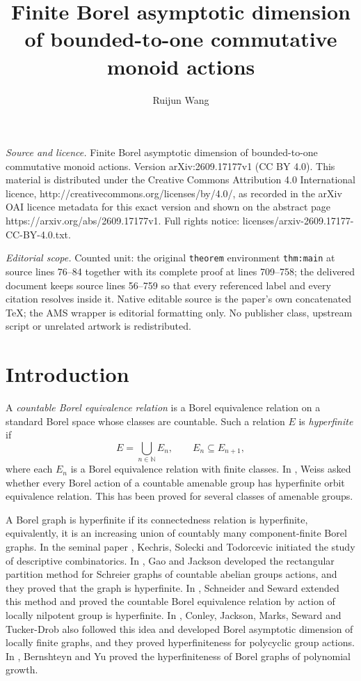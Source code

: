 \documentclass[10pt,a4paper]{amsart}
\newcommand{\NN}{\mathbb N}
\begin{document}
\title[Finite Borel asymptotic dimension of bounded-to-one commutat]{Finite Borel asymptotic dimension of bounded-to-one commutative monoid actions}
\author{Ruijun Wang}
\date{}
\maketitle
\noindent\emph{Source and licence.} Finite Borel asymptotic dimension of bounded-to-one commutative monoid actions. Version arXiv:2609.17177v1 (CC BY 4.0). This material is distributed under the Creative Commons Attribution 4.0 International licence, http://creativecommons.org/licenses/by/4.0/, as recorded in the arXiv OAI licence metadata for this exact version and shown on the abstract page https://arxiv.org/abs/2609.17177v1. Full rights notice: licenses/arxiv-2609.17177-CC-BY-4.0.txt.\par\smallskip
\noindent\textit{Editorial scope.} Counted unit: the original \texttt{theorem} environment \texttt{thm:main} at source lines 76--84 together with its complete proof at lines 709--758; the delivered document keeps source lines 56--759 so that every referenced label and every citation resolves inside it. Native editable source is the paper's own concatenated TeX; the AMS wrapper is editorial formatting only. No publisher class, upstream script or unrelated artwork is redistributed.
\section{Introduction}

A \emph{countable Borel equivalence relation} is a Borel equivalence
relation on a standard Borel space whose classes are countable. Such a
relation $E$ is \emph{hyperfinite} if
\[
 E=\bigcup_{n\in\NN}E_n,
 \qquad E_n\subseteq E_{n+1},
\]
where each $E_n$ is a Borel equivalence relation with finite classes.
In \cite{weiss1984}, Weiss asked whether every Borel action of a countable
amenable group has hyperfinite orbit equivalence relation. This has been
proved for several classes of amenable groups.

A Borel graph is hyperfinite if its connectedness relation is hyperfinite, equivalently, it is an increasing union of countably many component-finite Borel graphs. In the seminal paper \cite{KST1999}, Kechris, Solecki and Todorcevic initiated the study of descriptive combinatorics. In \cite{GJ2015}, Gao and Jackson developed the rectangular partition method for Schreier graphs of countable abelian groups actions, and they proved that the graph is hyperfinite. In \cite{SchneiderSeward2024}, Schneider and Seward extended this method and proved the countable Borel equivalence relation by action of locally nilpotent group is hyperfinite. In \cite{CJMST}, Conley, Jackson, Marks, Seward and Tucker-Drob also followed this idea and developed Borel asymptotic dimension of locally finite graphs, and they proved hyperfiniteness for polycyclic group actions. In \cite{BY}, Bernshteyn and Yu proved the hyperfiniteness of Borel graphs of polynomial growth.
\end{document}
